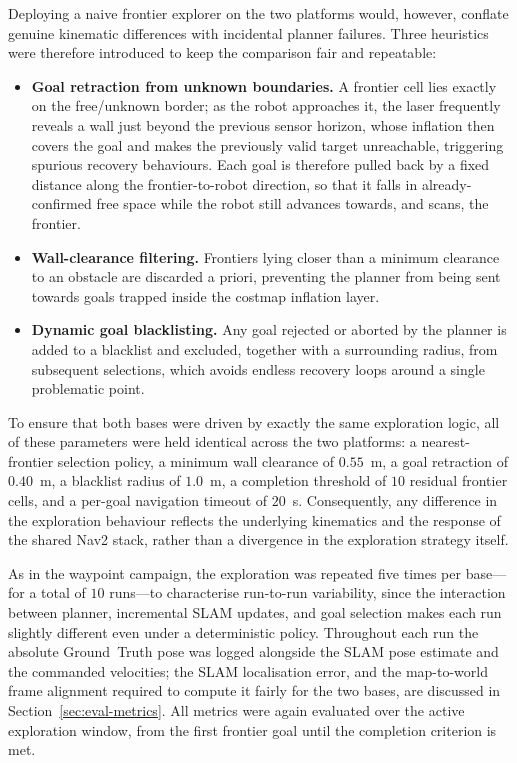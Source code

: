 Deploying a naive frontier explorer on the two platforms would, however, conflate genuine kinematic differences with incidental planner failures. Three heuristics were therefore introduced to keep the comparison fair and repeatable:
\begin{itemize}
    \item \textbf{Goal retraction from unknown boundaries.} A frontier cell lies exactly on the free/unknown border; as the robot approaches it, the laser frequently reveals a wall just beyond the previous sensor horizon, whose inflation then covers the goal and makes the previously valid target unreachable, triggering spurious recovery behaviours. Each goal is therefore pulled back by a fixed distance along the frontier-to-robot direction, so that it falls in already-confirmed free space while the robot still advances towards, and scans, the frontier.
    \item \textbf{Wall-clearance filtering.} Frontiers lying closer than a minimum clearance to an obstacle are discarded a priori, preventing the planner from being sent towards goals trapped inside the costmap inflation layer.
    \item \textbf{Dynamic goal blacklisting.} Any goal rejected or aborted by the planner is added to a blacklist and excluded, together with a surrounding radius, from subsequent selections, which avoids endless recovery loops around a single problematic point.
\end{itemize}

To ensure that both bases were driven by exactly the same exploration logic, all of these parameters were held identical across the two platforms: a nearest-frontier selection policy, a minimum wall clearance of $0.55$~m, a goal retraction of $0.40$~m, a blacklist radius of $1.0$~m, a completion threshold of $10$ residual frontier cells, and a per-goal navigation timeout of $20$~s. Consequently, any difference in the exploration behaviour reflects the underlying kinematics and the response of the shared Nav2 stack, rather than a divergence in the exploration strategy itself.

As in the waypoint campaign, the exploration was repeated five times per base---for a total of $10$ runs---to characterise run-to-run variability, since the interaction between planner, incremental SLAM updates, and goal selection makes each run slightly different even under a deterministic policy. Throughout each run the absolute Ground~Truth pose was logged alongside the SLAM pose estimate and the commanded velocities; the SLAM localisation error, and the map-to-world frame alignment required to compute it fairly for the two bases, are discussed in Section~\ref{sec:eval-metrics}. All metrics were again evaluated over the active exploration window, from the first frontier goal until the completion criterion is met.

